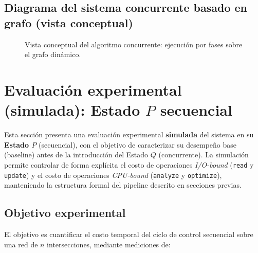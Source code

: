 \documentclass[12pt]{article}
\begin{document}
\subsection{Diagrama del sistema concurrente basado en grafo (vista conceptual)}

\begin{figure}[H]
\centering
{}
\caption{Vista conceptual del algoritmo concurrente: ejecución por fases sobre el grafo dinámico.}
\label{fig:grafo_concurrente}
\end{figure}

\section{Evaluación experimental (simulada): Estado \(P\) secuencial}

Esta sección presenta una evaluación experimental \textbf{simulada} del sistema en su \textbf{Estado \(P\)}
(secuencial), con el objetivo de caracterizar su desempeño base (baseline) antes de la introducción del Estado \(Q\)
(concurrente). La simulación permite controlar de forma explícita el costo de operaciones \textit{I/O-bound}
(\texttt{read} y \texttt{update}) y el costo de operaciones \textit{CPU-bound} (\texttt{analyze} y \texttt{optimize}),
manteniendo la estructura formal del pipeline descrito en secciones previas.

\subsection{Objetivo experimental}

El objetivo es cuantificar el costo temporal del ciclo de control secuencial sobre una red de \(n\) intersecciones,
mediante mediciones de:
\end{document}
